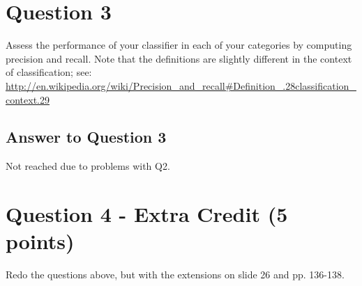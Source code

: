 \documentclass{article}
\begin{document}


\newpage
\section*{Question 3}

Assess the performance of your classifier in each of your categories by computing precision and recall. Note that the definitions are slightly different in the context of classification; see: \url{http://en.wikipedia.org/wiki/Precision_and_recall#Definition_.28classification_context.29}

\subsection*{Answer to Question 3}

Not reached due to problems with Q2.



\newpage

\section*{Question 4 - Extra Credit (5 points)}

Redo the questions above, but with the extensions on slide 26 and pp. 136-138.
\end{document}
